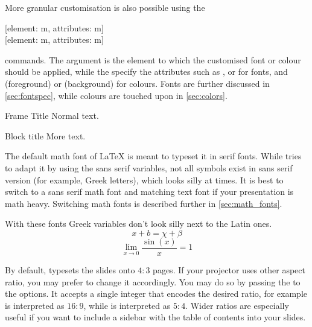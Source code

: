 More granular customisation is also possible using the
\begin{lscommand}
  [element: m, attributes: m] \\
  [element: m, attributes: m]
\end{lscommand}
commands. The  argument is the element to which the customised
font or colour should be applied, while the  specify the
attributes such as ,  or  for fonts, and
 (foreground) or  (background) for colours. Fonts are
further discussed in \autoref{sec:fontspec}, while colours are touched upon in
\autoref{sec:colors}.
\begin{example}

\begin{frame}{Frame Title}
  Normal text.
  \begin{block}{Block title}
    More text.
  \end{block}
\end{frame}
\end{example}

The default math font of \LaTeX{} is meant to typeset it in serif fonts. While
 tries to adapt it by using the sans serif variables, not all
symbols exist in sans serif version (for example, Greek letters), which looks
silly at times. It is best to switch to a sans serif math font and matching
text font if your presentation is math heavy. Switching math fonts is described
further in \autoref{sec:math_fonts}.
\begin{example}
\usepackage{unicode-math}
\setsansfont{Fira Sans}
\setoperatorfont{\mathsf}

\begin{frame} %
With these fonts Greek
variables don't look silly
next to the Latin ones.
\[ x + b = \chi + \beta \]
\[ \lim_{x \to 0}
   \frac{\sin(x)}{x} = 1 \]
\end{frame} %
\end{example}

By default,  typesets the slides onto \(4 : 3\) pages. If your
projector uses other aspect ratio, you may prefer to change it accordingly. You
may do so by passing the  to the  options.
It accepts a single integer that encodes the desired ratio, for example
 is interpreted as \(16:9\), while  is interpreted as
\(5:4\). Wider ratios are especially useful if you want to include a sidebar
with the table of contents into your slides.

